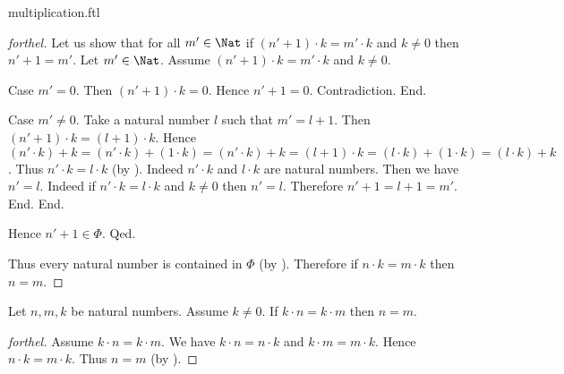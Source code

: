 \documentclass{naproche-library}
\begin{document}
\begin{smodule}{multiplication.ftl}
\begin{proof}[forthel]
      Let us show that for all $m' \in \Nat$ if $(n' + 1) \cdot k = m' \cdot k$ and $k \neq 0$ then $n' + 1 = m'$.
        Let $m' \in \Nat$.
        Assume $(n' + 1) \cdot k = m' \cdot k$ and $k \neq 0$.

        Case $m' = 0$.
          Then $(n' + 1) \cdot k = 0$.
          Hence $n' + 1 = 0$.
          Contradiction.
        End.

        Case $m' \neq 0$.
          Take a natural number $l$ such that $m' = l + 1$.
          Then $(n' + 1) \cdot k = (l + 1) \cdot k$.
          Hence $(n' \cdot k) + k
            = (n' \cdot k) + (1 \cdot k)
            = (n' \cdot k) + k
            = (l + 1) \cdot k
            = (l \cdot k) + (1 \cdot k)
            = (l \cdot k) + k$.
          Thus $n' \cdot k = l \cdot k$ (by ).
          Indeed $n' \cdot k$ and $l \cdot k$ are natural numbers.
          Then we have $n' = l$.
          Indeed if $n' \cdot k = l \cdot k$ and $k \neq 0$ then $n' = l$.
          Therefore $n' + 1 = l + 1 = m'$.
        End.
      End.

      Hence $n' + 1 \in \Phi$.
    Qed.

    Thus every natural number is contained in $\Phi$ (by ).
    Therefore if $n \cdot k = m \cdot k$ then $n = m$.
  \end{proof}

  \begin{corollary}[forthel,id=ARITHMETIC_06_8575191374364672]
    Let $n, m, k$ be natural numbers.
    Assume $k \neq 0$.
    If $k \cdot n = k \cdot m$ then $n = m$.
  \end{corollary}
  \begin{proof}[forthel]
    Assume $k \cdot n = k \cdot m$.
    We have $k \cdot n = n \cdot k$ and $k \cdot m = m \cdot k$.
    Hence $n \cdot k = m \cdot k$.
    Thus $n = m$ (by ).
  \end{proof}
\end{smodule}
\end{document}
